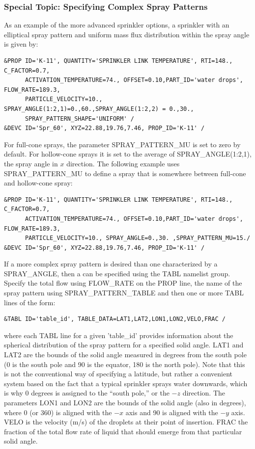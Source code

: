 \documentclass[11pt]{book}
\begin{document}
\subsubsection{Special Topic: Specifying Complex Spray Patterns}
\label{info:spraypattern}
\label{info:TABL}

As an example of the more advanced sprinkler options, a sprinkler with an elliptical spray pattern and uniform mass flux distribution within the spray angle is given by:
\begin{lstlisting}
&PROP ID='K-11', QUANTITY='SPRINKLER LINK TEMPERATURE', RTI=148., C_FACTOR=0.7,
      ACTIVATION_TEMPERATURE=74., OFFSET=0.10,PART_ID='water drops', FLOW_RATE=189.3,
      PARTICLE_VELOCITY=10., SPRAY_ANGLE(1:2,1)=0.,60.,SPRAY_ANGLE(1:2,2) = 0.,30.,
      SPRAY_PATTERN_SHAPE='UNIFORM' /
&DEVC ID='Spr_60', XYZ=22.88,19.76,7.46, PROP_ID='K-11' /
\end{lstlisting}
For full-cone sprays, the parameter {\ct SPRAY\_PATTERN\_MU} is set to zero by default. For hollow-cone sprays it is set to the average of {\ct SPRAY\_ANGLE(1:2,1)}, the spray angle in $x$ direction. The following example uses  {\ct SPRAY\_PATTERN\_MU} to define a spray that is somewhere between full-cone and hollow-cone spray:
\begin{lstlisting}
&PROP ID='K-11', QUANTITY='SPRINKLER LINK TEMPERATURE', RTI=148., C_FACTOR=0.7,
      ACTIVATION_TEMPERATURE=74., OFFSET=0.10,PART_ID='water drops', FLOW_RATE=189.3,
      PARTICLE_VELOCITY=10., SPRAY_ANGLE=0.,30. ,SPRAY_PATTERN_MU=15./
&DEVC ID='Spr_60', XYZ=22.88,19.76,7.46, PROP_ID='K-11' /
\end{lstlisting}
If a more complex spray pattern is desired than one characterized by a {\ct SPRAY\_ANGLE}, then a  can be specified using the {\ct TABL} namelist group. Specify the total flow using {\ct FLOW\_RATE} on the {\ct PROP} line, the name of the spray pattern using {\ct SPRAY\_PATTERN\_TABLE} and then one or more {\ct TABL} lines of the form:
\begin{lstlisting}
&TABL ID='table_id', TABLE_DATA=LAT1,LAT2,LON1,LON2,VELO,FRAC /
\end{lstlisting}
where each {\ct TABL} line for a given {\ct 'table\_id'} provides information about the spherical distribution of the spray pattern for a specified solid angle. {\ct LAT1} and {\ct LAT2} are the bounds of the solid angle measured in degrees from the south pole (0 is the south pole and 90 is the equator, 180 is the north pole).  Note that this is not the conventional way of specifying a latitude, but rather a convenient system based on the fact that a typical sprinkler sprays water downwards, which is why 0 degrees is assigned to the ``south pole,'' or the $-z$ direction. The parameters {\ct LON1} and {\ct LON2} are the bounds of the solid angle (also in degrees), where 0 (or 360) is aligned with the $-x$ axis and 90 is aligned with the $-y$ axis.  {\ct VELO} is the velocity (m/s) of the droplets at their point of insertion. {\ct FRAC} the fraction of the total flow rate of liquid that should emerge from that particular solid angle.
\end{document}
